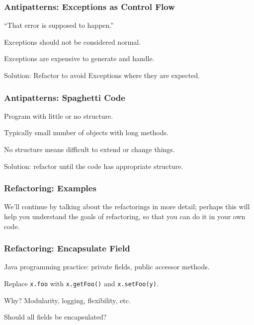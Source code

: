\begin{frame}
\frametitle{Antipatterns: Exceptions as Control Flow}
\begin{changemargin}{1cm}
``That error is supposed to happen.''

Exceptions should not be considered normal.

Exceptions are expensive to generate and handle.

Solution: Refactor to avoid Exceptions where they are expected.

\end{changemargin}
\end{frame}


\begin{frame}
\frametitle{Antipatterns: Spaghetti Code}
\begin{changemargin}{1cm}
Program with little or no structure.

Typically small number of objects with long methods.

No structure means difficult to extend or change things.

Solution: refactor until the code has appropriate structure.


\end{changemargin}
\end{frame}

\begin{frame}
\frametitle{Refactoring: Examples}
\begin{changemargin}{1cm}

We'll continue by talking about the
refactorings in more detail; perhaps this will help you understand the
goals of refactoring, so that you can do it in your own code.

\end{changemargin}
\end{frame}


\begin{frame}
\frametitle{Refactoring: Encapsulate Field}
\begin{changemargin}{1cm}

Java programming practice: private fields, public accessor methods. 

Replace {\tt x.foo} with {\tt x.getFoo()} and {\tt x.setFoo(y)}. 

Why? Modularity, logging, flexibility, etc. 

Should all fields be encapsulated? 

\end{changemargin}
\end{frame}

